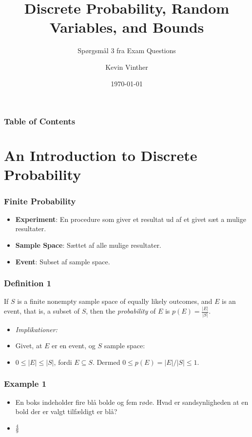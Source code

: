 \documentclass{beamer}
\title{Discrete Probability, Random Variables, and Bounds}
\subtitle{Spørgsmål 3 fra Exam Questions}
\author{Kevin Vinther}
\date{\today}
\begin{document}
\begin{frame}
  \titlepage
\end{frame}

\begin{frame}[allowframebreaks]
  \frametitle{Table of Contents}
  \tableofcontents
\end{frame}

\section{An Introduction to Discrete Probability}

\begin{frame}[allowframebreaks]
  \frametitle{Finite Probability}
  \begin{itemize}
  \item \textbf{Experiment}: En procedure som giver et resultat ud af et givet sæt a mulige resultater.
  \item \textbf{Sample Space}: Sættet af alle mulige resultater.
  \item \textbf{Event}: Subset af sample space.
  \end{itemize} 
\end{frame}

\begin{frame}
  \frametitle{Definition 1}
  \begin{definition}
    If $S$ is a finite nonempty sample space of equally likely outcomes, and $E$ is an event, that is, a subset of $S$, then the \textit{probability} of $E$ is $p(E) = \frac{|E|}{|S|}$.
  \end{definition}
  \begin{itemize}
  \item \textit{Implikationer:}
  \item Givet, at $E$ er en event, og $S$ sample space:
  \item $0 \leq |E| \leq |S|$, fordi $E \subseteq S$. Dermed $0 \leq p(E) = |E|/|S| \leq 1$.
  \end{itemize}
\end{frame}

\begin{frame}
  \frametitle{Example 1}
  \begin{itemize}
  \item<1-> En boks indeholder fire blå bolde og fem røde. Hvad er sandsynligheden at en bold der er valgt tilfældigt er blå?
  \item<2-> $\frac{4}{9}$
  \end{itemize}
\end{frame}
\end{document}

